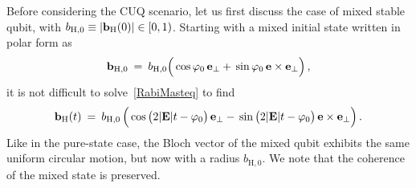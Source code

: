 \documentclass[12pt,a4paper]{article}
\begin{document}
Before considering the CUQ scenario, let us first discuss the case of mixed stable qubit, with $b_{\text{H},0} \equiv|{\bf b}_{\rm H}(0)| \in [0,1)$. Starting with a mixed initial state written in polar form as
\begin{equation}
    \mathbf{b}_{\rm H,0}\: =\: b_{\text{H},0}\Big(\cos\varphi_0\,\mathbf{e}_{\perp} +\, \sin\varphi_0\, \mathbf{e}\times \mathbf{e}_{\perp}\Big)\,,
\end{equation}
it is not difficult to solve~\eqref{RabiMasteq} to find
\begin{equation}
    \mathbf{b}_{\rm H}(t)\: =\: b_{\text{H},0}\,\Big(\cos\big(2|\mathbf{E}|t-\varphi_0 \big)\,\mathbf{e}_{\perp} -\, \sin\big(2|\mathbf{E}|t-\varphi_0 \big)\, \mathbf{e}\times \mathbf{e}_{\perp}\Big)\, .\label{mixRabisol}
\end{equation}
Like in the pure-state case, the Bloch vector of the mixed qubit exhibits the same uniform circular motion, but now with a radius $b_{\text{H},0}$. We note that the coherence of the mixed state is preserved.
\end{document}
